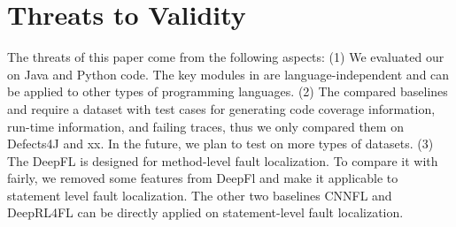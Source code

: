 \section{Threats to Validity}
The threats of this paper come from the following aspects: 
(1) We evaluated our {\tool} on Java and Python code. The key modules in {\tool} are language-independent and can be applied to other types of programming languages. 
(2) The compared baselines and {\tool} require a dataset with test cases for generating code coverage information, run-time information, and failing traces, thus we only compared them on Defects4J and xx. In the future, we plan to test {\tool} on more types of datasets. 
(3) The DeepFL is designed for method-level fault localization. To compare it with {\tool} fairly, we removed some features from DeepFl and make it applicable to statement level fault localization. 
The other two baselines CNNFL and DeepRL4FL can be directly applied on statement-level fault localization. 

